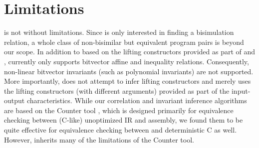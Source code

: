 
\section{Limitations}
\label{sec:limitations}

\toolName{} is not without limitations.
Since \toolName{} is only interested in finding a bisimulation relation,
a whole class of non-bisimilar but equivalent program pairs is beyond our scope.
In addition to \recursiveRelations{} based on the lifting constructors provided as part of \pre{} and \post{},
\toolName{} currently only supports bitvector affine and inequality relations.
Consequently, non-linear bitvector invariants (such as polynomial invariants) are not supported.
More importantly, \toolName{} does not attempt to infer lifting constructors and merely
uses the lifting constructors (with different arguments) provided as part of the input-output characteristics.
While our correlation and invariant inference algorithms are based on the Counter tool \cite{oopsla20},
which is designed primarily for equivalence checking between (C-like) unoptimized IR and assembly, we found them to be
quite effective for equivalence checking between \SpecL{} and deterministic C as well.
However, \toolName{} inherits many of the limitations of the Counter tool.


